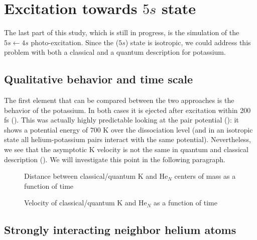 \section{Excitation towards $5s$ state}

The last part of this study, which is still in progress, is the simulation of the $5s\leftarrow 4s$ photo-excitation. 
Since the ($5s$) state is isotropic, we could address this problem with both a classical and a quantum description for potassium.

\subsection{Qualitative behavior and time scale}

The first element that can be compared between the two approaches is the behavior of the potassium. 
In both cases it is ejected after excitation within 200 fs (). 
This was actually highly predictable looking at the pair potential (): it shows a potential energy of 700 K over the dissociation level (and in an isotropic state all helium-potassium pairs interact with the same potential). Nevertheless, we see that the asymptotic K velocity is not the same  in quantum and classical description (). We will investigate this point in the following paragraph.

\begin{figure}[h!]
	\centering
	\begin{minipage}[c]{0.48\linewidth}
		
		\vspace{0.2\baselineskip}
		\caption{Distance between classical/quantum K and He$_N$ centers of mass as a function of time\label{fig:5S-pos}}
	\end{minipage}
\hfill
	\begin{minipage}[c]{0.48\linewidth}
		
		\vspace{0.2\baselineskip}
		\caption{Velocity of classical/quantum K and He$_N$ as a function of time\newline{}\label{fig:5S-vel}}
	\end{minipage}
\end{figure}

\subsection{Strongly interacting neighbor helium atoms}

